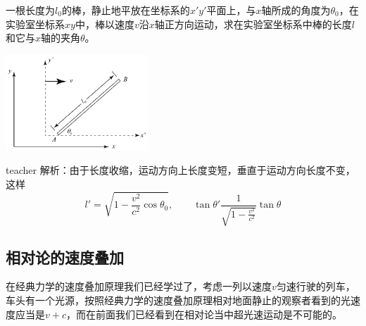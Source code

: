 \begin{example}
一根长度为$l_0$的棒，静止地平放在坐标系的$x'y'$平面上，与$x$轴所成的角度为$\theta_0$，在实验室坐标系$xy$中，棒以速度$v$沿$x$轴正方向运动，求在实验室坐标系中棒的长度$l$和它与$x$轴的夹角$\theta$。
\begin{flushright}
\includegraphics[width = 0.4\textwidth]{images/relativity-7.pdf} 
\end{flushright}

\begin{taggedblock}{teacher}
\noindent
解析：由于长度收缩，运动方向上长度变短，垂直于运动方向长度不变，这样
\[
l' = \sqrt{1- \frac{v^2}{c^2}\cos\theta_0},\qquad \tan\theta' \frac{1}{\sqrt{1-\frac{v^2}{c^2}}}\tan\theta
\]
\end{taggedblock}
\end{example}

\subsection{相对论的速度叠加}
在经典力学的速度叠加原理我们已经学过了，考虑一列以速度$v$匀速行驶的列车，车头有一个光源，按照经典力学的速度叠加原理相对地面静止的观察者看到的光速度应当是$v+c$，而在前面我们已经看到在相对论当中超光速运动是不可能的。

